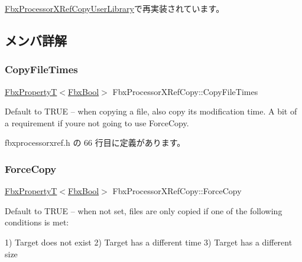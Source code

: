 \hyperlink{class_fbx_processor_x_ref_copy_user_library_a65545232dad661700a6c43e90530b3a6}{Fbx\+Processor\+X\+Ref\+Copy\+User\+Library}で再実装されています。



\subsection{メンバ詳解}
\mbox{\label{class_fbx_processor_x_ref_copy_af289c6fcb05767b0ef362376790efee7}} 
\subsubsection{\texorpdfstring{Copy\+File\+Times}{CopyFileTimes}}
{\footnotesize\ttfamily \hyperlink{class_fbx_property_t}{Fbx\+PropertyT}$<$\hyperlink{fbxtypes_8h_a92e0562b2fe33e76a242f498b362262e}{Fbx\+Bool}$>$ Fbx\+Processor\+X\+Ref\+Copy\+::\+Copy\+File\+Times}

Default to T\+R\+UE -- when copying a file, also copy its modification time. A bit of a requirement if you\textquotesingle{}re not going to use Force\+Copy. 

 fbxprocessorxref.\+h の 66 行目に定義があります。

\mbox{\label{class_fbx_processor_x_ref_copy_ad0ab8028a48ec1f2062a75aab8f1b023}} 
\subsubsection{\texorpdfstring{Force\+Copy}{ForceCopy}}
{\footnotesize\ttfamily \hyperlink{class_fbx_property_t}{Fbx\+PropertyT}$<$\hyperlink{fbxtypes_8h_a92e0562b2fe33e76a242f498b362262e}{Fbx\+Bool}$>$ Fbx\+Processor\+X\+Ref\+Copy\+::\+Force\+Copy}

Default to T\+R\+UE -- when not set, files are only copied if one of the following conditions is met\+:

1) Target does not exist 2) Target has a different time 3) Target has a different size 

